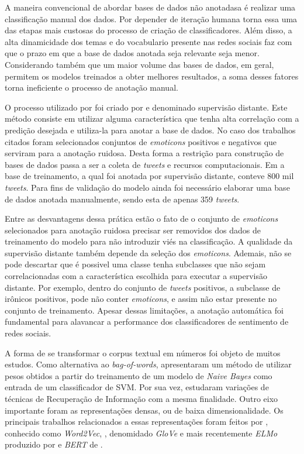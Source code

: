 A maneira convencional de abordar bases de dados não anotadasa é realizar uma
classificação manual dos dados.
Por depender de iteração humana torna essa uma das etapas mais custosas do
processo de criação de classificadores.
Além disso, a alta dinamicidade dos temas e do vocabulario presente nas redes
sociais faz com que o prazo em que a base de dados anotada seja relevante seja
menor.
Considerando também que um maior volume das bases de dados, em geral, permitem
os modelos treinados a obter melhores resultados, a soma desses fatores torna
ineficiente o processo de anotação manual.

O processo utilizado por \citet{go09} foi criado por \citet{read05} e denominado
supervisão distante.
Este método consiste em utilizar alguma característica que tenha alta correlação
com a predição desejada e utiliza-la para anotar a base de dados.
No caso dos trabalhos citados foram selecionados conjuntos de \textit{emoticons}
positivos e negativos que serviram para a anotação ruidosa.
Desta forma a restrição para construção de bases de dados passa a ser a coleta
de \textit{tweets} e recursos computacionais.
Em \citet{go09} a base de treinamento, a qual foi anotada por supervisão
distante, conteve 800 mil \textit{tweets}.
Para fins de validação do modelo ainda foi necessário elaborar uma base de
dados anotada manualmente, sendo esta de apenas 359 \textit{tweets}.


Entre as desvantagens dessa prática estão o fato de o conjunto de
\textit{emoticons} selecionados para anotação ruidosa precisar ser removidos dos
dados de treinamento do modelo para não introduzir viés na classificação.
A qualidade da supervisão distante também depende da seleção dos
\textit{emoticons}.
Ademais, não se pode descartar que é possivel uma classe tenha subclasses que
não sejam correlacionadas com a característica escolhida para executar a
supervisão distante.
Por exemplo, dentro do conjunto de \textit{tweets} positivos, a subclasse de
 irônicos positivos, pode não conter \textit{emoticons}, e assim
não estar presente no conjunto de treinamento.
Apesar dessas limitações, a anotação automática foi fundamental para alavancar
a performance dos classificadores de sentimento de redes sociais.


A forma de se transformar o corpus textual em números foi objeto de muitos
estudos.
Como alternativa ao \textit{bag-of-words}, \citet{wang12} apresentaram um método
de utilizar pesos obtidos a partir do treinamento de um modelo de
\textit{Naive Bayes} como entrada de um classificador de SVM.
Por sua vez, \citet{paltoglou10} estudaram variações de técnicas de Recuperação
de Informação com a mesma finalidade.
Outro eixo importante foram as representações densas, ou de baixa
dimensionalidade.
Os principais trabalhos relacionados a essas representações foram feitos por
\citet{mikolov13}, conhecido como \textit{Word2Vec}, \citet{pennington14},
denomidado \textit{GloVe} e mais recentemente \textit{ELMo} produzido por
\citet{peters18} e \textit{BERT} de \citet{devlin18}.

